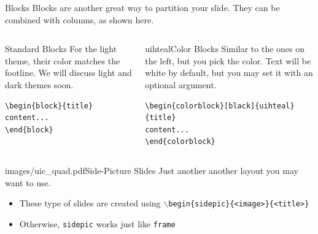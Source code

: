 \documentclass{beamer}
\begin{document}
\begin{frame}[fragile]{Blocks}
Blocks are another great way to partition your slide. They can be combined with columns, as shown here.
\begin{columns}
\begin{column}{0.3\textwidth}
\begin{block}{Standard Blocks}
For the light theme, their color matches the footline. We will discuss light and dark themes soon.
\begin{verbatim}
\begin{block}{title}
content...
\end{block}
\end{verbatim}
\end{block}
\end{column}
\begin{column}{0.7\textwidth}
\begin{colorblock}[black]{uihteal}{Color Blocks}
Similar to the ones on the left, but you pick the color. Text will be white by 
default, but you may set it with an optional argument.
\small
\begin{verbatim}
\begin{colorblock}[black]{uihteal}{title}
content...
\end{colorblock}
\end{verbatim}
\end{colorblock}
\end{column}
\end{columns}
\end{frame}


\begin{sidepic}{images/uic_quad.pdf}{Side-Picture Slides}
Just another another layout you may want to use.
\begin{itemize}
\item These type of slides are created using \texttt{$\backslash$begin\{sidepic\}\{<image>\}\{<title>\}}
\item Otherwise, \texttt{sidepic} works just like \texttt{frame}
\end{itemize}
\end{sidepic}


\renewcommand{\algorithmicrequire}{\textbf{Input:}}
\renewcommand{\algorithmicensure}{\textbf{Output:}}
\newcommand*\CALL[2]{\textsc{#1}(#2)}
\newcommand*\ANNOTATE[1]{\hfill\(\triangleright\) #1}%

\footlinecolor{}
\end{document}

